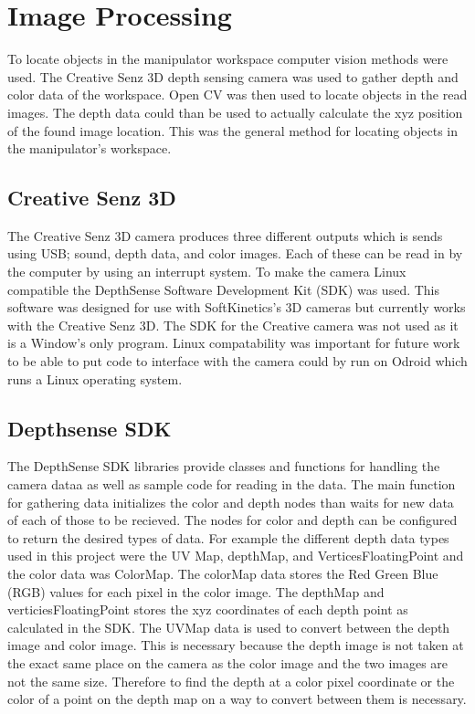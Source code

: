 \documentclass[letterpaper,12pt]{report}
\begin{document}
\chapter{Image Processing}
To locate objects in the manipulator workspace computer vision methods were used. The Creative Senz 3D depth sensing camera was used to gather depth and color data of the workspace. Open CV was then used to locate objects in the read images. The depth data could than be used to actually calculate the xyz position of the found image location. This was the general method for locating objects in the manipulator's workspace.

\section{Creative Senz 3D}
The Creative Senz 3D camera produces three different outputs which is sends using USB; sound, depth data, and color images. Each of these can be read in by the computer by using an interrupt system. To make the camera Linux compatible the DepthSense Software Development Kit (SDK) was used. This software was designed for use with SoftKinetics's 3D cameras but currently works with the Creative Senz 3D. The SDK for the Creative camera was not used as it is a Window's only program. Linux compatability was important for future work to be able to put code to interface with the camera could by run on Odroid which runs a Linux operating system. 

\section{Depthsense SDK}
The DepthSense SDK libraries provide classes and functions for handling the camera dataa as well as sample code for reading in the data. The main function for gathering data initializes the color and depth nodes than waits for new data of each of those to be recieved. The nodes for color and depth can be configured to return the desired types of data. For example the different depth data types used in this project were the UV Map, depthMap, and VerticesFloatingPoint and the color data was ColorMap. The colorMap data stores the Red Green Blue (RGB) values for each pixel in the color image. The depthMap and verticiesFloatingPoint stores the xyz coordinates of each depth point as calculated in the SDK. The UVMap data is used to convert between the depth image and color image. This is necessary because the depth image is not taken at the exact same place on the camera as the color image and the two images are not the same size. Therefore to find the depth at a color pixel coordinate or the color of a point on the depth map on a way to convert between them is necessary.
\end{document}

